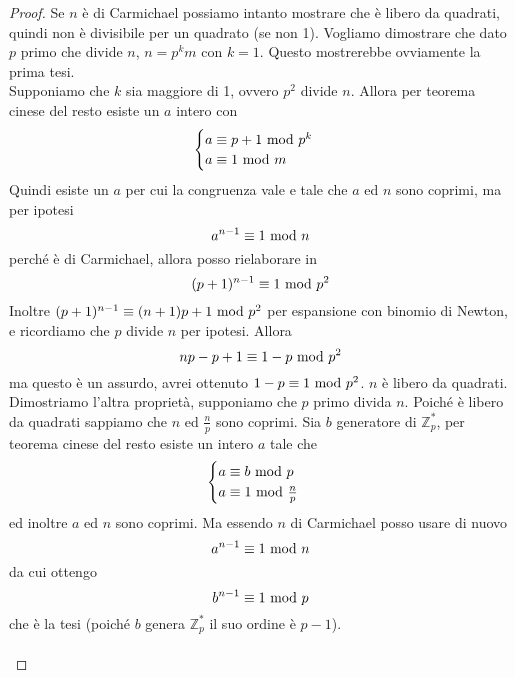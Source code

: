 \begin{proof}
	Se $n$ è di Carmichael possiamo intanto mostrare che è libero da quadrati, quindi non è divisibile per un quadrato (se non 1). Vogliamo dimostrare che dato $p$ primo che divide $n$, $n=p^km$ con $k=1$. Questo mostrerebbe ovviamente la prima tesi. \\ Supponiamo che $k$ sia maggiore di 1, ovvero $p^2$ divide $n$. Allora per teorema cinese del resto esiste un $a$ intero con 
	\begin{equation*}
	\begin{cases}
	a\equiv p+1\ \mathrm{mod}\ p^k\\
	a\equiv 1\ \mathrm{mod}\ m
	\end{cases}
	\end{equation*}
	Quindi esiste un $a$ per cui la congruenza vale e tale che $a$ ed $n$ sono coprimi, ma per ipotesi
	\begin{equation*}
	a^{n-1}\equiv1\ \mathrm{mod}\ n
	\end{equation*}
	perché è di Carmichael, allora posso rielaborare in 
	\begin{equation*}
	(p+1)^{n-1}\equiv1\ \mathrm{mod}\ p^2
	\end{equation*}
	Inoltre $(p+1)^{n-1}\equiv(n+1)p+1\ \mathrm{mod}\ p^2$ per espansione con binomio di Newton, e ricordiamo che $p$ divide $n$ per ipotesi. Allora
	\begin{equation*}
	np-p+1\equiv1-p\ \mathrm{mod}\ p^2
	\end{equation*}
	ma questo è un assurdo, avrei ottenuto $1-p\equiv1\ \mathrm{mod}\ p^2$. $n$ è libero da quadrati. \\ Dimostriamo l'altra proprietà, supponiamo che $p$ primo divida $n$. Poiché è libero da quadrati sappiamo che $n$ ed $\frac{n}{p}$ sono coprimi. Sia $b$ generatore di $\mathbb{Z}_p^*$, per teorema cinese del resto esiste un intero $a$ tale che 
	\begin{equation*}
	\begin{cases}
	a\equiv b\ \mathrm{mod}\ p\\
	a\equiv 1\ \mathrm{mod}\ \frac{n}{p}
	\end{cases}
	\end{equation*}
	ed inoltre $a$ ed $n$ sono coprimi. Ma essendo $n$ di Carmichael posso usare di nuovo
	\begin{equation*}
	a^{n-1}\equiv1\ \mathrm{mod}\ n
	\end{equation*}
	da cui ottengo
	\begin{equation*}
	b^{n-1}\equiv1\ \mathrm{mod}\ p
	\end{equation*}
	che è la tesi (poiché $b$ genera $\mathbb{Z}_p^*$ il suo ordine è $p-1$). \\ \\ 

\end{proof}
